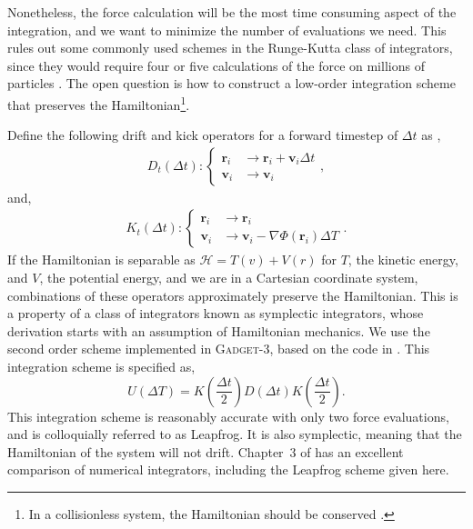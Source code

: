 Nonetheless, the force calculation will be the most time consuming aspect of the integration, and we want to minimize the number of evaluations we need. This rules out some commonly used schemes in the Runge-Kutta class of integrators, since they would require four or five calculations of the force on millions of particles \citep{numerical_recipes_fortran}. The open question is how to construct a low-order integration scheme that preserves the Hamiltonian\footnote{In a collisionless system, the Hamiltonian should be conserved \citep{BT}.}.

Define the following drift and kick operators for a forward timestep of $\Delta t$ as \citep{quinn_1997},
\begin{eqnarray}
D_t(\Delta t) : \begin{cases} 
	  \textbf{r}_i & \longrightarrow  \textbf{r}_i + \textbf{v}_i \Delta t\\
      \textbf{v}_i & \longrightarrow  \textbf{v}_i 
   \end{cases},
\end{eqnarray}
and,
\begin{eqnarray}
K_t(\Delta t) : \begin{cases} 
	  \textbf{r}_i & \longrightarrow  \textbf{r}_i\\
      \textbf{v}_i & \longrightarrow  \textbf{v}_i  - \nabla \Phi(\textbf{r}_i) \Delta T
   \end{cases}.
\end{eqnarray}
If the Hamiltonian is separable as $\mathcal{H} = T(v) + V(r)$ for $T$, the kinetic energy, and  $V$, the potential energy, and we are in a Cartesian coordinate system, combinations of these operators approximately preserve the Hamiltonian. This is a property of a class of integrators known as symplectic integrators, whose derivation starts with an assumption of Hamiltonian mechanics. We use the second order scheme implemented in \textsc{Gadget-3}, based on the code in \citet{GadgetCodePaper}. This integration scheme is specified as,
\begin{equation}
U(\Delta T) = K(\frac{\Delta t}{2}) D(\Delta t) K(\frac{\Delta t}{2}).
\end{equation}
This integration scheme is reasonably accurate with only two force evaluations, and is colloquially referred to as Leapfrog. It is also symplectic, meaning that the Hamiltonian of the system will not drift. Chapter~3 of \citet{BT} has an excellent comparison of numerical integrators, including the Leapfrog scheme given here.

